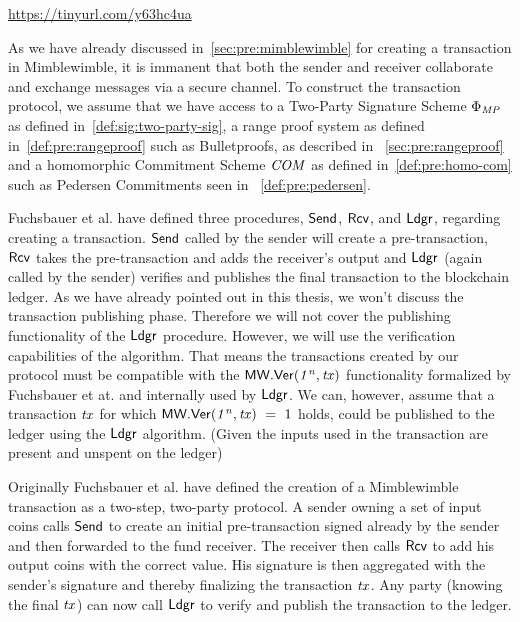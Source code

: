 \urldef\urlgrinexplained\url{https://tinyurl.com/y63hc4ua}

As we have already discussed in~\cref{sec:pre:mimblewimble} for creating a transaction in Mimblewimble, it is immanent that both the sender and receiver collaborate and exchange messages via a secure channel.
To construct the transaction protocol, we assume that we have access to a Two-Party Signature Scheme $\Phi_{\mathit{MP}}$ as defined in~\cref{def:sig:two-party-sig}, a  range proof system as defined in~\cref{def:pre:rangeproof} such as Bulletproofs, as described in ~\cref{sec:pre:rangeproof} and a homomorphic Commitment Scheme $\mathit{COM}$ as defined in~\cref{def:pre:homo-com} such as Pedersen Commitments seen in ~\cref{def:pre:pedersen}.

Fuchsbauer et al. have defined three procedures, $\mathsf{Send}$, $\mathsf{Rcv}$, and $\mathsf{Ldgr}$, regarding creating a transaction.
$\mathsf{Send}$ called by the sender will create a pre-transaction, $\mathsf{Rcv}$ takes the pre-transaction and adds the receiver's output and $\mathsf{Ldgr}$ (again called by the sender) verifies and publishes the final transaction to the blockchain ledger.
As we have already pointed out in this thesis, we won't discuss the transaction publishing phase.
Therefore we will not cover the publishing functionality of the $\mathsf{Ldgr}$ procedure.
However, we will use the verification capabilities of the algorithm.
That means the transactions created by our protocol must be compatible with the $\mathsf{MW.Ver(\mathit{1^n}, \mathit{tx})}$ functionality formalized by Fuchsbauer et at. and internally used by $\mathsf{Ldgr}$.
We can, however, assume that a transaction $\mathit{tx}$ for which $\mathsf{MW.Ver(\mathit{1^n}, \mathit{tx})} ~=~ 1$ holds, could be published to the ledger using the $\mathsf{Ldgr}$ algorithm. (Given the inputs used in the transaction are present and unspent on the ledger)

Originally Fuchsbauer et al. have defined the creation of a Mimblewimble transaction as a two-step, two-party protocol.
A sender owning a set of input coins calls $\mathsf{Send}$ to create an initial pre-transaction signed already by the sender and then forwarded to the fund receiver.
The receiver then calls $\mathsf{Rcv}$ to add his output coins with the correct value.
His signature is then aggregated with the sender's signature and thereby finalizing the transaction $\mathit{tx}$.
Any party (knowing the final $\mathit{tx}$) can now call $\mathsf{Ldgr}$ to verify and publish the transaction to the ledger.

